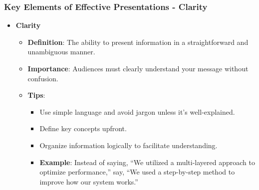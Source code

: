 \documentclass[aspectratio=169]{beamer}
\begin{document}
\begin{frame}[fragile]
    \frametitle{Key Elements of Effective Presentations - Clarity}
    \begin{itemize}
        \item \textbf{Clarity}
            \begin{itemize}
                \item \textbf{Definition}: The ability to present information in a straightforward and unambiguous manner.
                \item \textbf{Importance}: Audiences must clearly understand your message without confusion.
                \item \textbf{Tips}:
                    \begin{itemize}
                        \item Use simple language and avoid jargon unless it's well-explained.
                        \item Define key concepts upfront.
                        \item Organize information logically to facilitate understanding.
                        \item \textbf{Example}: Instead of saying, “We utilized a multi-layered approach to optimize performance,” say, “We used a step-by-step method to improve how our system works.”
                    \end{itemize}
            \end{itemize}
    \end{itemize}
\end{frame}
\end{document}
